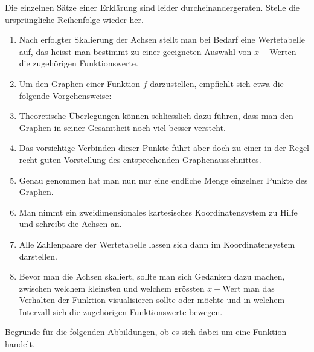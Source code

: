 \documentclass[11pt]{exam}
\begin{document}
\begin{questions}
\question[4]
Die einzelnen Sätze einer Erklärung sind leider durcheinandergeraten. Stelle die ursprüngliche Reihenfolge wieder her.
\begin{enumerate}
	\item Nach erfolgter Skalierung der Achsen stellt man bei Bedarf eine Wertetabelle auf, das heisst man bestimmt zu einer geeigneten Auswahl von $x-$Werten die zugehörigen Funktionswerte.
	\item Um den Graphen einer Funktion $f$ darzustellen, empfiehlt sich etwa die folgende Vorgehensweise:
	\item Theoretische Überlegungen können schliesslich dazu führen, dass man den Graphen in seiner Gesamtheit noch viel besser versteht.
	\item Das vorsichtige Verbinden dieser Punkte führt aber doch zu einer in der Regel recht guten Vorstellung des entsprechenden Graphenausschnittes.
	\item Genau genommen hat man nun nur eine endliche Menge einzelner Punkte des Graphen.
	\item Man nimmt ein zweidimensionales kartesisches Koordinatensystem zu Hilfe und schreibt die Achsen an.
	\item Alle Zahlenpaare der Wertetabelle lassen sich dann im Koordinatensystem darstellen.
	\item Bevor man die Achsen skaliert, sollte man sich Gedanken dazu machen, zwischen welchem kleinsten und welchem grössten $x-$Wert man das Verhalten der Funktion visualisieren sollte oder möchte und in welchem Intervall sich die zugehörigen Funktionswerte bewegen.
\end{enumerate}


\question[4] %
Begründe für die folgenden Abbildungen, ob es sich dabei um eine Funktion handelt.
\begin{parts}

\end{parts}
\end{questions}
\end{document}
